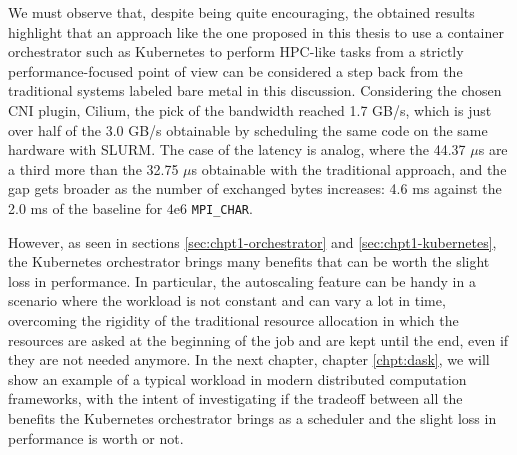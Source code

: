 We must observe that, despite being quite encouraging, the obtained results
highlight that an approach like the one proposed in this thesis to use a
container orchestrator such as Kubernetes to perform HPC-like tasks from a
strictly performance-focused point of view can be considered a step back from
the traditional systems labeled bare metal in this discussion.
Considering the chosen CNI plugin, Cilium, the pick of the bandwidth reached 1.7
GB/s, which is just over half of the 3.0 GB/s obtainable by scheduling the same
code on the same hardware with SLURM.
The case of the latency is analog, where the 44.37 $\mu$s are a third more than
the 32.75 $\mu$s obtainable with the traditional approach, and the gap gets
broader as the number of exchanged bytes increases: 4.6 ms against the 2.0 ms of
the baseline for $4\mathrm{e}{6}$ \texttt{MPI\_CHAR}.

However, as seen in sections \ref{sec:chpt1-orchestrator} and
\ref{sec:chpt1-kubernetes}, the Kubernetes orchestrator brings many benefits
that can be worth the slight loss in performance.
In particular, the autoscaling feature can be handy in a scenario where the
workload is not constant and can vary a lot in time, overcoming the rigidity of
the traditional resource allocation in which the resources are asked at the
beginning of the job and are kept until the end, even if they are not needed
anymore.
In the next chapter, chapter \ref{chpt:dask}, we will show an example of a
typical workload in modern distributed computation frameworks, with the intent
of investigating if the tradeoff between all the benefits the Kubernetes
orchestrator brings as a scheduler and the slight loss in performance is worth
or not.

